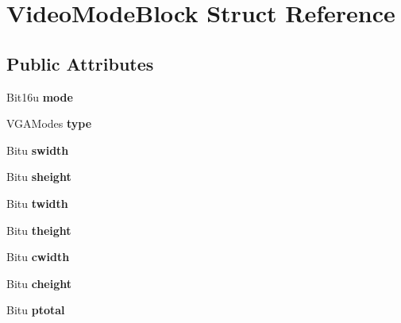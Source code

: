 \hypertarget{structVideoModeBlock}{\section{Video\-Mode\-Block Struct Reference}
\label{structVideoModeBlock}
}
\subsection*{Public Attributes}
\begin{DoxyCompactItemize}
\item 
\hypertarget{structVideoModeBlock_a11d610c28bc75df3fc18c0ca531d16a2}{Bit16u {\bfseries mode}}\label{structVideoModeBlock_a11d610c28bc75df3fc18c0ca531d16a2}

\item 
\hypertarget{structVideoModeBlock_a659844f92c6f4094578497e8a3329d58}{V\-G\-A\-Modes {\bfseries type}}\label{structVideoModeBlock_a659844f92c6f4094578497e8a3329d58}

\item 
\hypertarget{structVideoModeBlock_ab43c5695189c13ae6d4d5e3d5b49d67e}{Bitu {\bfseries swidth}}\label{structVideoModeBlock_ab43c5695189c13ae6d4d5e3d5b49d67e}

\item 
\hypertarget{structVideoModeBlock_a8056861c71b2c3b0711b3d7d5513e7e6}{Bitu {\bfseries sheight}}\label{structVideoModeBlock_a8056861c71b2c3b0711b3d7d5513e7e6}

\item 
\hypertarget{structVideoModeBlock_a5417ad96289adf35f663bd8dd254de95}{Bitu {\bfseries twidth}}\label{structVideoModeBlock_a5417ad96289adf35f663bd8dd254de95}

\item 
\hypertarget{structVideoModeBlock_aa29fd0266515830a755132edd43f570b}{Bitu {\bfseries theight}}\label{structVideoModeBlock_aa29fd0266515830a755132edd43f570b}

\item 
\hypertarget{structVideoModeBlock_a940bf20968121ce63e454bfe95314070}{Bitu {\bfseries cwidth}}\label{structVideoModeBlock_a940bf20968121ce63e454bfe95314070}

\item 
\hypertarget{structVideoModeBlock_a83f300881649858a9dfc77c9646fde46}{Bitu {\bfseries cheight}}\label{structVideoModeBlock_a83f300881649858a9dfc77c9646fde46}

\item 
\hypertarget{structVideoModeBlock_a6558e1defaaf1a070b19eb1e471caf84}{Bitu {\bfseries ptotal}}\label{structVideoModeBlock_a6558e1defaaf1a070b19eb1e471caf84}


\end{DoxyCompactItemize}
